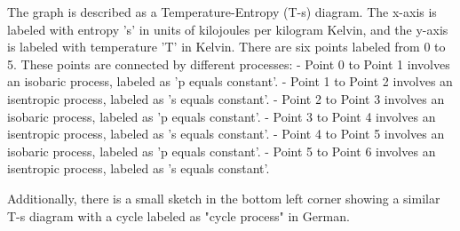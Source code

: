 The graph is described as a Temperature-Entropy (T-s) diagram. The x-axis is labeled with entropy 's' in units of kilojoules per kilogram Kelvin, and the y-axis is labeled with temperature 'T' in Kelvin. There are six points labeled from 0 to 5. These points are connected by different processes:
- Point 0 to Point 1 involves an isobaric process, labeled as 'p equals constant'.
- Point 1 to Point 2 involves an isentropic process, labeled as 's equals constant'.
- Point 2 to Point 3 involves an isobaric process, labeled as 'p equals constant'.
- Point 3 to Point 4 involves an isentropic process, labeled as 's equals constant'.
- Point 4 to Point 5 involves an isobaric process, labeled as 'p equals constant'.
- Point 5 to Point 6 involves an isentropic process, labeled as 's equals constant'.

Additionally, there is a small sketch in the bottom left corner showing a similar T-s diagram with a cycle labeled as "cycle process" in German.